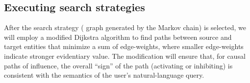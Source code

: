 \documentclass[11pt,notitlepage]{article}
\begin{document}

\vspace{-2ex}
\subsection{Executing search strategies}
\label{section:Dijkstra}
After the search strategy ({\color{red} graph} generated by the Markov chain) is selected, we will
employ a modified Dijkstra algorithm to find paths between source and target
entities that minimize a sum of edge-weights, where smaller edge-weights
indicate stronger evidentiary value. The modification will ensure that, for
causal paths of influence, the overall ``sign'' of the path (activating or
inhibiting) is consistent with the semantics of the user's natural-language query.

\end{document}
